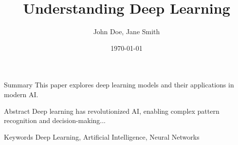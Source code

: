 \documentclass{beamer}
\title{Understanding Deep Learning}
\author{John Doe, Jane Smith}
\date{\today}
\begin{document}
\frame{\titlepage}

\begin{frame}{Summary}
    This paper explores deep learning models and their applications in modern AI.
\end{frame}

\begin{frame}{Abstract}
    Deep learning has revolutionized AI, enabling complex pattern recognition and decision-making...
\end{frame}

\begin{frame}{Keywords}
    Deep Learning, Artificial Intelligence, Neural Networks
\end{frame}
\end{document}
